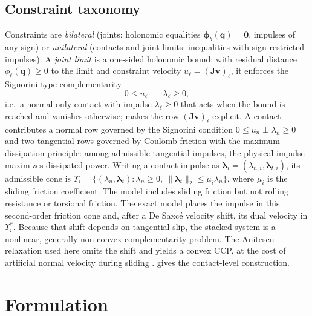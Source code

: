 \documentclass{article}
\newcommand{\Jac}{\mathbf{J}}
\newcommand{\vv}{\mathbf{v}}
\newcommand{\blam}{\boldsymbol{\lambda}}
\newcommand{\bphi}{\boldsymbol{\phi}}
\newcommand{\cone}{\Upsilon}
\theoremstyle{plain}
\theoremstyle{definition}
\begin{document}
\subsection{Constraint taxonomy}
\label{sec:taxonomy}
Constraints are \emph{bilateral} (joints: holonomic equalities
$\bphi_b(\mathbf q)=\mathbf 0$, impulses of any sign) or \emph{unilateral}
(contacts and joint limits: inequalities with sign-restricted impulses). A
\emph{joint limit} is a one-sided holonomic bound: with residual distance
$\phi_\ell(\mathbf q)\ge0$ to the limit and constraint velocity
$u_\ell=(\Jac\vv)_\ell$, it enforces the Signorini-type complementarity
\begin{equation}
0\le u_\ell \ \perp\ \lambda_\ell\ge0 ,
\label{eq:limit}
\end{equation}
i.e.\ a normal-only contact with impulse $\lambda_\ell\ge0$ that acts when the
bound is reached and vanishes otherwise;  makes the row
$(\Jac\vv)_\ell$ explicit. A
contact contributes a normal row governed by the Signorini condition
$0\le u_n\perp\lambda_n\ge0$ and two tangential rows governed by Coulomb friction
with the maximum-dissipation principle: among admissible tangential impulses,
the physical impulse maximizes dissipated power. Writing a contact impulse as
$\blam_i=(\lambda_{n,i},\boldsymbol\lambda_{t,i})$, its admissible cone is
$\cone_i=\{(\lambda_n,\boldsymbol\lambda_t):\lambda_n\ge0,\
\|\boldsymbol\lambda_t\|_2\le\mu_i\lambda_n\}$, where $\mu_i$ is the sliding
friction coefficient. The model includes sliding friction but not rolling
resistance or torsional friction. The exact model places the
impulse in this second-order friction cone and, after a De Saxc\'e
velocity shift, its dual velocity in $\cone_i^{*}$. Because that shift depends
on tangential slip, the stacked system is a nonlinear, generally non-convex
complementarity problem. The Anitescu relaxation used here omits the shift and
yields a convex CCP, at the cost of artificial normal velocity during sliding
\cite{anitescu2006,tasora2011}. \Cref{app:friction_ccp} gives the contact-level
construction.

\section{Formulation}
\label{sec:formulation}
\end{document}
